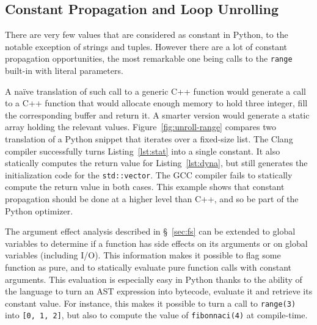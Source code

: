 \documentclass[10pt, preprint]{sigplanconf}
\begin{document}

\subsection{Constant Propagation and Loop Unrolling}

There are very few values that are considered as constant in Python, to the
notable exception of strings and tuples. However there are a lot of constant
propagation opportunities, the most remarkable one being calls to the
\texttt{range} built-in with literal parameters.

A naïve translation of such call to a generic C++ function would generate a
call to a C++ function that would allocate enough memory to hold three integer,
fill the corresponding buffer and return it. A smarter version would generate a
static array holding the relevant values. Figure~\ref{fig:unroll-range}
compares two translation of a Python snippet that iterates over a fixed-size
list. The Clang compiler successfully turns Listing~\ref{lst:stat} into a
single constant. It also statically computes the return value for
Listing~\ref{lst:dyna}, but still generates the initialization code for the
\texttt{std::vector}. The GCC compiler fails to statically compute the return
value in both cases. This example shows that constant propagation should be
done at a higher level than C++, and so be part of the Python optimizer.

The argument effect analysis described in \S~\ref{sec:fs} can be extended to
global variables to determine if a function has side effects on its arguments or
on global variables (including I/O). This information makes it possible to flag
some function as pure, and to statically evaluate pure function calls with
constant arguments. This evaluation is especially easy in Python thanks to the
ability of the language to turn an AST expression into bytecode, evaluate it
and retrieve its constant value. For instance, this makes it possible to turn a
call to \texttt{range(3)} into \texttt{[0, 1, 2]}, but also to compute the
value of \texttt{fibonnaci(4)} at compile-time.
\end{document}
